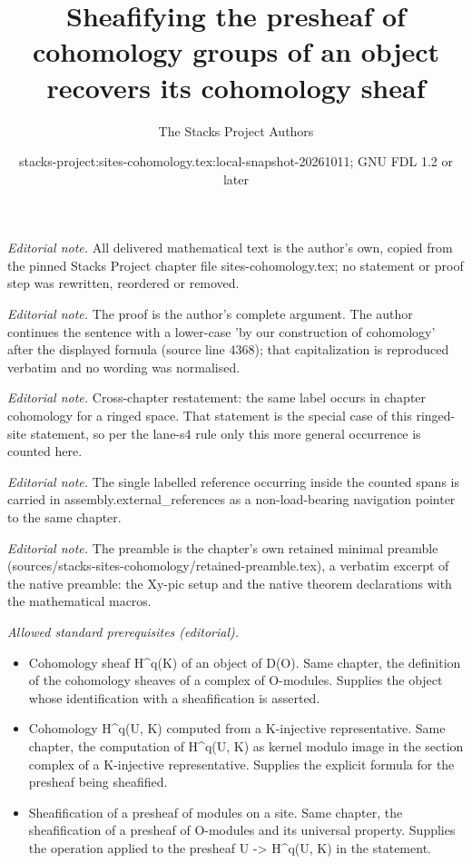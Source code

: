 \documentclass[10pt,a4paper]{amsart}
\title{Sheafifying the presheaf of cohomology groups of an object recovers its cohomology sheaf}
\author{The Stacks Project Authors}
\date{stacks-project:sites-cohomology.tex:local-snapshot-20261011; GNU FDL 1.2 or later}
\theoremstyle{plain}
\theoremstyle{definition}
\theoremstyle{remark}
\numberwithin{equation}{subsection}
\begin{document}
\maketitle
\noindent\textit{Editorial note.} All delivered mathematical text is the author's own, copied from the pinned Stacks Project chapter file sites-cohomology.tex; no statement or proof step was rewritten, reordered or removed.\par\medskip
\noindent\textit{Editorial note.} The proof is the author's complete argument. The author continues the sentence with a lower-case 'by our construction of cohomology' after the displayed formula (source line 4368); that capitalization is reproduced verbatim and no wording was normalised.\par\medskip
\noindent\textit{Editorial note.} Cross-chapter restatement: the same label occurs in chapter cohomology for a ringed space. That statement is the special case of this ringed-site statement, so per the lane-s4 rule only this more general occurrence is counted here.\par\medskip
\noindent\textit{Editorial note.} The single labelled reference occurring inside the counted spans is carried in assembly.external\_references as a non-load-bearing navigation pointer to the same chapter.\par\medskip
\noindent\textit{Editorial note.} The preamble is the chapter's own retained minimal preamble (sources/stacks-sites-cohomology/retained-preamble.tex), a verbatim excerpt of the native preamble: the Xy-pic setup and the native theorem declarations with the mathematical macros.\par\medskip
\noindent\textit{Allowed standard prerequisites (editorial).}\begin{itemize}
\item Cohomology sheaf H\textasciicircum{}q(K) of an object of D(O). Same chapter, the definition of the cohomology sheaves of a complex of O-modules. Supplies the object whose identification with a sheafification is asserted.
\item Cohomology H\textasciicircum{}q(U, K) computed from a K-injective representative. Same chapter, the computation of H\textasciicircum{}q(U, K) as kernel modulo image in the section complex of a K-injective representative. Supplies the explicit formula for the presheaf being sheafified.
\item Sheafification of a presheaf of modules on a site. Same chapter, the sheafification of a presheaf of O-modules and its universal property. Supplies the operation applied to the presheaf U -> H\textasciicircum{}q(U, K) in the statement.
\end{itemize}\medskip
\end{document}
